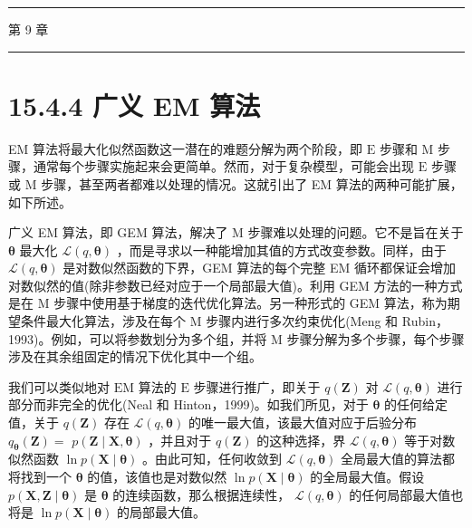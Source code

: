 \documentclass[10pt]{report}
\newcommand{\HRule}{\begin{center}\rule{0.9\linewidth}{0.2mm}\end{center}}
\begin{document}
\HRule

第 9 章

\HRule

\section*{15.4.4 广义 EM 算法}

EM 算法将最大化似然函数这一潜在的难题分解为两个阶段，即 \(\mathrm{E}\) 步骤和 \(\mathrm{M}\) 步骤，通常每个步骤实施起来会更简单。然而，对于复杂模型，可能会出现 \(\mathrm{E}\) 步骤或 \(\mathrm{M}\) 步骤，甚至两者都难以处理的情况。这就引出了 EM 算法的两种可能扩展，如下所述。

广义 EM 算法，即 GEM 算法，解决了 M 步骤难以处理的问题。它不是旨在关于 \(\mathbf{\theta }\) 最大化 \(\mathcal{L}\left( {q,\mathbf{\theta }}\right)\) ，而是寻求以一种能增加其值的方式改变参数。同样，由于 \(\mathcal{L}\left( {q,\mathbf{\theta }}\right)\) 是对数似然函数的下界，GEM 算法的每个完整 EM 循环都保证会增加对数似然的值(除非参数已经对应于一个局部最大值)。利用 GEM 方法的一种方式是在 M 步骤中使用基于梯度的迭代优化算法。另一种形式的 GEM 算法，称为期望条件最大化算法，涉及在每个 M 步骤内进行多次约束优化(Meng 和 Rubin，1993)。例如，可以将参数划分为多个组，并将 \(\mathrm{M}\) 步骤分解为多个步骤，每个步骤涉及在其余组固定的情况下优化其中一个组。

我们可以类似地对 \(\mathrm{{EM}}\) 算法的 \(\mathrm{E}\) 步骤进行推广，即关于 \(q\left( \mathbf{Z}\right)\) 对 \(\mathcal{L}\left( {q,\mathbf{\theta }}\right)\) 进行部分而非完全的优化(Neal 和 Hinton，1999)。如我们所见，对于 \(\mathbf{\theta }\) 的任何给定值，关于 \(q\left( \mathbf{Z}\right)\) 存在 \(\mathcal{L}\left( {q,\mathbf{\theta }}\right)\) 的唯一最大值，该最大值对应于后验分布 \({q}_{\mathbf{\theta }}\left( \mathbf{Z}\right)  =\)  \(p\left( {\mathbf{Z} \mid  \mathbf{X},\mathbf{\theta }}\right)\) ，并且对于 \(q\left( \mathbf{Z}\right)\) 的这种选择，界 \(\mathcal{L}\left( {q,\mathbf{\theta }}\right)\) 等于对数似然函数 \(\ln p\left( {\mathbf{X} \mid  \mathbf{\theta }}\right)\) 。由此可知，任何收敛到 \(\mathcal{L}\left( {q,\mathbf{\theta }}\right)\) 全局最大值的算法都将找到一个 \(\mathbf{\theta }\) 的值，该值也是对数似然 \(\ln p\left( {\mathbf{X} \mid  \mathbf{\theta }}\right)\) 的全局最大值。假设 \(p\left( {\mathbf{X},\mathbf{Z} \mid  \mathbf{\theta }}\right)\) 是 \(\mathbf{\theta }\) 的连续函数，那么根据连续性， \(\mathcal{L}\left( {q,\mathbf{\theta }}\right)\) 的任何局部最大值也将是 \(\ln p\left( {\mathbf{X} \mid  \mathbf{\theta }}\right)\) 的局部最大值。
\end{document}
